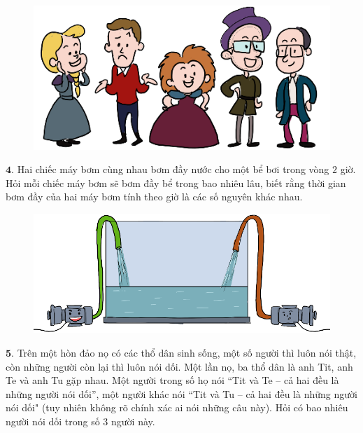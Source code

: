 \begin{multicols}{2}
		\begin{figure}[H]
		\vspace*{-5pt}
		\centering
		\captionsetup{labelformat= empty, justification=centering}
		\includegraphics[width= 1\linewidth]{b3}
		\vspace*{-15pt}
	\end{figure}
	$\pmb{4.}$ Hai chiếc máy bơm cùng nhau bơm đầy nước cho một bể bơi trong vòng $2$ giờ. Hỏi mỗi chiếc máy bơm sẽ bơm đầy bể trong bao nhiêu lâu, biết rằng thời gian bơm đầy của hai máy bơm tính theo giờ là các số nguyên khác nhau.
	\begin{figure}[H]
		\vspace*{-5pt}
		\centering
		\captionsetup{labelformat= empty, justification=centering}
		\includegraphics[width= 0.9\linewidth]{b4}
		\vspace*{-5pt}
	\end{figure}
	$\pmb{5.}$ Trên một hòn đảo nọ có các thổ dân sinh sống, một số người thì luôn nói thật, còn những người còn lại thì luôn nói dối. Một lần nọ, ba thổ dân là anh Tit, anh Te và anh Tu gặp nhau. Một người trong số họ nói ``Tit và Te -- cả hai đều là những  người nói dối'', một người khác nói ``Tit và Tu -- cả hai đều là những người nói dối" (tuy nhiên không rõ chính xác ai nói những câu này). Hỏi có bao nhiêu người nói dối trong số $3$ người này.
	\begin{figure}[H]
		\vspace*{-5pt}

\end{figure}
\end{multicols}
